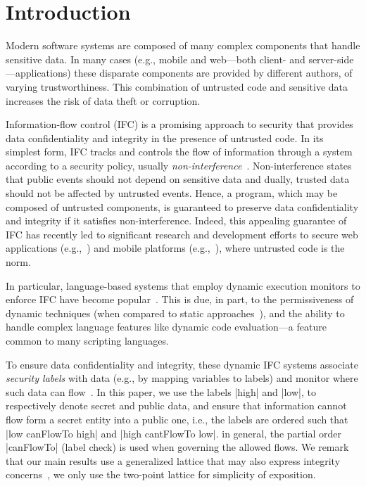 \section{Introduction}
\label{sec:intro}

Modern software systems are composed of many complex components that
handle sensitive data.
%
In many cases (e.g., mobile and web---both client- and
server-side---applications) these disparate components are provided
by different authors, of varying trustworthiness.
%
This combination of untrusted code and sensitive data 
increases the risk of data theft or corruption.

Information-flow control (IFC) is a promising approach to security
that provides data confidentiality and integrity in the presence of
untrusted code.
%
In its simplest form, IFC tracks and controls the flow of information
through a system according to a security policy, usually
\emph{non-interference}~\cite{Goguen:Meseguer:Noninterference}.
%
Non-interference states that public events should not depend on
sensitive data and dually, trusted data should not be affected by
untrusted events.
%
Hence, a program, which may be composed of untrusted components, is
guaranteed to preserve data confidentiality and integrity if it
satisfies non-interference.
%
Indeed, this appealing guarantee of IFC has recently led to significant
research and development efforts %
to secure web
applications (e.g.,~\cite{DeGroef:2012:FWB:2382196.2382275,
giffin:hails, yang:2013:towards, Hedin13}) and mobile platforms
(e.g.,~\cite{Enck:2010,android:esorics13}), where untrusted code is
the norm.

In particular, language-based systems that employ dynamic execution
monitors to enforce IFC have become popular~\cite{Hedin2011}.
%
This is due, in part, to the permissiveness of dynamic techniques
(when compared to static approaches~\cite{Sabelfeld:Russo:PSI09}), 
 and the ability to handle complex language features like dynamic code evaluation---a feature
common to many scripting languages.
 
To ensure data confidentiality and integrity, these dynamic IFC
systems associate \emph{security labels} with data (e.g., by mapping
variables to labels) and monitor where such data can
flow~\cite{myers:dlm, Stefan:2011}.  
%
In this paper, we use the labels |high| and |low|, to respectively
denote secret and public data, and ensure that information cannot flow
form a secret entity into a public one, i.e., the labels are ordered
such that |low canFlowTo high| and |high cantFlowTo low|.
%
in general, the partial order |canFlowTo| (label check) is used when
governing the allowed flows.
%
We remark that our main results use a generalized lattice that may
 also express integrity concerns~\cite{myers:dlm, Stefan:2011}, we
 only use the two-point lattice for simplicity of exposition.
 
